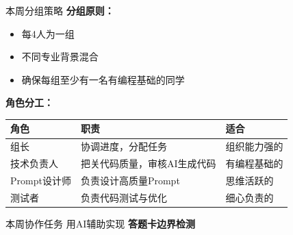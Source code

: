 \documentclass[aspectratio=169, 10pt]{beamer}
\begin{document}
\begin{frame}{本周分组策略}
	\textbf{分组原则：}
	\begin{itemize}
		\item 每4人为一组
		\item 不同专业背景混合
		\item 确保每组至少有一名有编程基础的同学
	\end{itemize}

	\vspace{0.3cm}

	\textbf{角色分工：}
	\begin{table}
		\centering
		\small
		\begin{tabular}{lp{5cm}l}
			\toprule
			\textbf{角色} & \textbf{职责} & \textbf{适合} \\
			\midrule
			组长 & 协调进度，分配任务 & 组织能力强的 \\
			技术负责人 & 把关代码质量，审核AI生成代码 & 有编程基础的 \\
			Prompt设计师 & 负责设计高质量Prompt & 思维活跃的 \\
			测试者 & 负责代码测试与优化 & 细心负责的 \\
			\bottomrule
		\end{tabular}
	\end{table}

	\vspace{0.3cm}

	\begin{block}{本周协作任务}
		用AI辅助实现 \textbf{答题卡边界检测}
	\end{block}
\end{frame}







\end{document}

